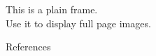 \begin{frame}[plain]
	\begin{center}
	  This is a plain frame.\\
	  Use it to display full page images.
	  \end{center}
\end{frame}

\begin{frame}[allowframebreaks]{References}

  \nocite{*}
  
  

\end{frame}
